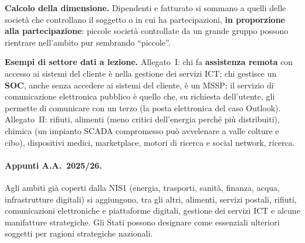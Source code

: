 \textbf{Calcolo della dimensione.} Dipendenti e fatturato si sommano a quelli delle società che
controllano il soggetto o in cui ha partecipazioni, \textbf{in proporzione alla partecipazione}: piccole
società controllate da un grande gruppo possono rientrare nell'ambito pur sembrando ``piccole''.

\textbf{Esempi di settore dati a lezione.} Allegato~I: chi fa \textbf{assistenza remota} con accesso ai
sistemi del cliente è nella gestione dei servizi ICT; chi gestisce un \textbf{SOC}, anche senza accedere
ai sistemi del cliente, è un MSSP; il servizio di comunicazione elettronica pubblico è quello che, su
richiesta dell'utente, gli permette di comunicare con un terzo (la posta elettronica del caso Outlook).
Allegato~II: rifiuti, alimenti (meno critici dell'energia perché più distribuiti), chimica (un impianto
SCADA compromesso può avvelenare a valle colture e cibo), dispositivi medici, marketplace, motori di
ricerca e social network, ricerca.

\paragraph{Appunti A.A.~2025/26.} Agli ambiti già coperti dalla NIS1 (energia, trasporti, sanità,
finanza, acqua, infrastrutture digitali) si aggiungono, tra gli altri, alimenti, servizi postali,
rifiuti, comunicazioni elettroniche e piattaforme digitali, gestione dei servizi ICT e alcune
manifatture strategiche. Gli Stati possono designare come essenziali ulteriori soggetti per ragioni
strategiche nazionali.

